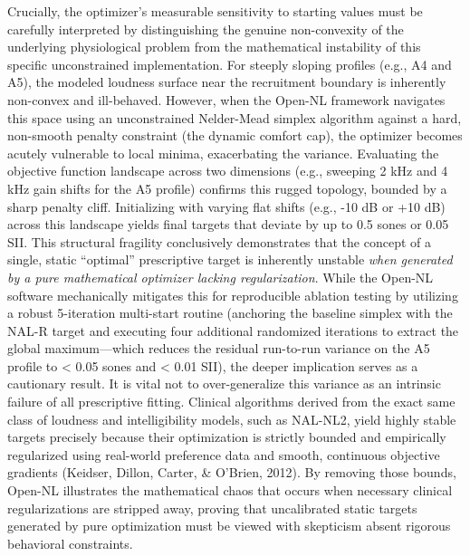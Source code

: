 \documentclass[
  12pt,
]{article}
\begin{document}
Crucially, the optimizer's measurable sensitivity to starting values
must be carefully interpreted by distinguishing the genuine
non-convexity of the underlying physiological problem from the
mathematical instability of this specific unconstrained implementation.
For steeply sloping profiles (e.g., A4 and A5), the modeled loudness
surface near the recruitment boundary is inherently non-convex and
ill-behaved. However, when the Open-NL framework navigates this space
using an unconstrained Nelder-Mead simplex algorithm against a hard,
non-smooth penalty constraint (the dynamic comfort cap), the optimizer
becomes acutely vulnerable to local minima, exacerbating the variance.
Evaluating the objective function landscape across two dimensions (e.g.,
sweeping 2 kHz and 4 kHz gain shifts for the A5 profile) confirms this
rugged topology, bounded by a sharp penalty cliff. Initializing with
varying flat shifts (e.g., -10 dB or +10 dB) across this landscape
yields final targets that deviate by up to 0.5 sones or 0.05 SII. This
structural fragility conclusively demonstrates that the concept of a
single, static ``optimal'' prescriptive target is inherently unstable
\emph{when generated by a pure mathematical optimizer lacking
regularization}. While the Open-NL software mechanically mitigates this
for reproducible ablation testing by utilizing a robust 5-iteration
multi-start routine (anchoring the baseline simplex with the NAL-R
target and executing four additional randomized iterations to extract
the global maximum---which reduces the residual run-to-run variance on
the A5 profile to \textless{} 0.05 sones and \textless{} 0.01 SII), the
deeper implication serves as a cautionary result. It is vital not to
over-generalize this variance as an intrinsic failure of all
prescriptive fitting. Clinical algorithms derived from the exact same
class of loudness and intelligibility models, such as NAL-NL2, yield
highly stable targets precisely because their optimization is strictly
bounded and empirically regularized using real-world preference data and
smooth, continuous objective gradients (Keidser, Dillon, Carter, \&
O'Brien, 2012). By removing those bounds, Open-NL illustrates the
mathematical chaos that occurs when necessary clinical regularizations
are stripped away, proving that uncalibrated static targets generated by
pure optimization must be viewed with skepticism absent rigorous
behavioral constraints.
\end{document}
